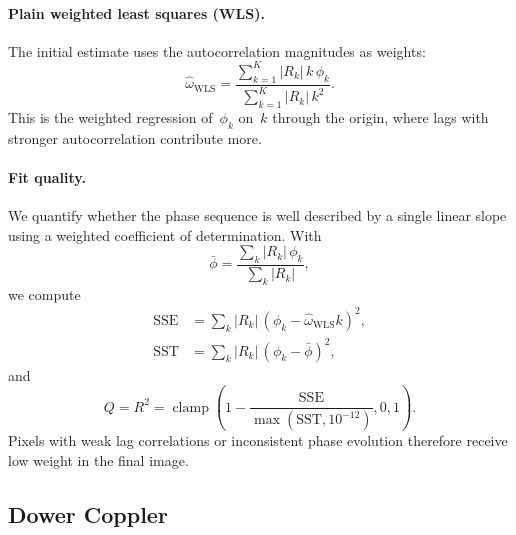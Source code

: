 \documentclass[11pt]{article}
\begin{document}
\paragraph{Plain weighted least squares (WLS).}
The initial estimate uses the autocorrelation magnitudes as weights:
\begin{equation}
  \hat\omega_{\text{WLS}}
  = \frac{\sum_{k=1}^K |R_k|\, k\, \phi_k}
         {\sum_{k=1}^K |R_k|\, k^2}.
  \label{eq:wls}
\end{equation}
This is the weighted regression of~$\phi_k$ on~$k$ through the
origin, where lags with stronger autocorrelation contribute more.

\paragraph{Fit quality.}
We quantify whether the phase sequence is well described by a single
linear slope using a weighted coefficient of determination.  With
\begin{equation}
  \bar{\phi} = \frac{\sum_k |R_k|\,\phi_k}{\sum_k |R_k|},
\end{equation}
we compute
\begin{align}
  \mathrm{SSE} &= \sum_k |R_k|\,(\phi_k-\hat\omega_{\mathrm{WLS}} k)^2,\\
  \mathrm{SST} &= \sum_k |R_k|\,(\phi_k-\bar{\phi})^2,
\end{align}
and
\begin{equation}
  Q = R^2 =
  \operatorname{clamp}\!\left(1-\frac{\mathrm{SSE}}{\max(\mathrm{SST},10^{-12})},0,1\right).
  \label{eq:phase_r2}
\end{equation}
Pixels with weak lag correlations or inconsistent phase evolution
therefore receive low weight in the final image.

\subsection{Dower Coppler}
\label{sec:signed_tmas}
\end{document}
